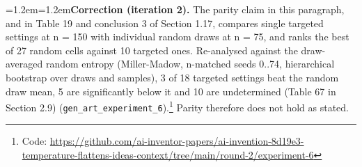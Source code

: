 \documentclass[11pt,letterpaper]{article}
\newenvironment{correction}{\par\medskip\noindent\begin{minipage}{\linewidth}\small\leftskip=1.2em\rightskip=1.2em\noindent}{\end{minipage}\par\medskip}
\begin{document}
\begin{correction}\textbf{Correction (iteration 2).} The parity claim in this paragraph, and in Table 19 and conclusion 3 of Section 1.17, compares single targeted settings at n = 150 with individual random draws at n = 75, and ranks the best of 27 random cells against 10 targeted ones. Re-analysed against the draw-averaged random entropy (Miller-Madow, n-matched seeds 0..74, hierarchical bootstrap over draws and samples), 3 of 18 targeted settings beat the random draw mean, 5 are significantly below it and 10 are undetermined (Table 67 in Section 2.9) (\texttt{gen\_\allowbreak{}art\_\allowbreak{}experiment\_\allowbreak{}6}).\footnote{Code: \url{https://github.com/ai-inventor-papers/ai-invention-8d19e3-temperature-flattens-ideas-context/tree/main/round-2/experiment-6}} Parity therefore does not hold as stated.\end{correction}
\begingroup\scriptsize
\setlength{\tabcolsep}{2.0pt}
\end{document}
